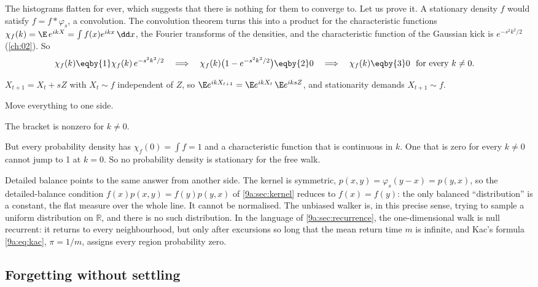 The histograms flatten for ever, which suggests that there is nothing for them to converge to.
Let us prove it. A stationary density $f$ would satisfy $f=f*\varphi_s$, a convolution. The
convolution theorem turns this into a product for the characteristic functions
$\chi_f(k)=\E\,e^{ikX}=\int f(x)e^{ikx}\,\dd x$, the Fourier transforms of the densities, and the
characteristic function of the Gaussian kick is $e^{-s^2k^2/2}$ (\cref{ch:02}). So
\begin{align}
  \chi_f(k)
  &\eqby{1}\chi_f(k)\,e^{-s^2k^2/2}
  \quad\Longrightarrow\quad
  \chi_f(k)\bigl(1-e^{-s^2k^2/2}\bigr)\eqby{2}0
  \quad\Longrightarrow\quad
  \chi_f(k)\eqby{3}0\ \ \text{for every }k\ne0 .
  \label{9a:eq:no-stationary}
\end{align}
\begin{explain}
  \item $X_{t+1}=X_t+sZ$ with $X_t\sim f$ independent of $Z$, so
        $\E e^{ikX_{t+1}}=\E e^{ikX_t}\,\E e^{iksZ}$, and stationarity demands $X_{t+1}\sim f$.
  \item Move everything to one side.
  \item The bracket is nonzero for $k\ne0$.
\end{explain}
But every probability density has $\chi_f(0)=\int f=1$ and a characteristic function that is
continuous in $k$. One that is zero for every $k\ne0$ cannot jump to 1 at $k=0$. So no
probability density is stationary for the free walk.

Detailed balance points to the same answer from another side. The kernel is symmetric,
$p(x,y)=\varphi_s(y-x)=p(y,x)$, so the detailed-balance condition
$f(x)p(x,y)=f(y)p(y,x)$ of \cref{9a:sec:kernel} reduces to $f(x)=f(y)$: the only balanced
``distribution'' is a constant, the flat measure over the whole line. It cannot be normalised.
The unbiased walker is, in this precise sense, trying to sample a uniform distribution on
$\mathbb R$, and there is no such distribution. In the language of \cref{9a:sec:recurrence}, the
one-dimensional walk is null recurrent: it returns to every neighbourhood, but only after
excursions so long that the mean return time $m$ is infinite, and Kac's formula
\eqref{9a:eq:kac}, $\pi=1/m$, assigns every region probability zero.

\subsection{Forgetting without settling}
\label{9a:sec:forget-no-settle}

